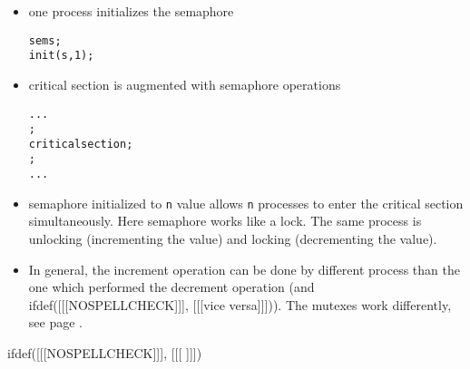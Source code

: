 
\begin{slide}
\begin{itemize}
\item one process initializes the semaphore
\begin{alltt}
sem s;
init(s, 1);
\end{alltt}
\item critical section is augmented with semaphore operations
\begin{alltt}
...
;
critical section;
;
...
\end{alltt}
\end{itemize}
\end{slide}


\begin{itemize}
\item semaphore initialized to \texttt{n} value allows \texttt{n} processes
to enter the critical section simultaneously. Here semaphore works like a lock.
The same process is unlocking (incrementing the value) and locking
(decrementing the value).
\item In general, the increment operation can be done by different process
than the one which performed the decrement operation (and
ifdef([[[NOSPELLCHECK]]], [[[vice versa]]])).
The mutexes work differently, see page \pageref{MUTEXES}.
\end{itemize}


ifdef([[[NOSPELLCHECK]]], [[[
]]])

